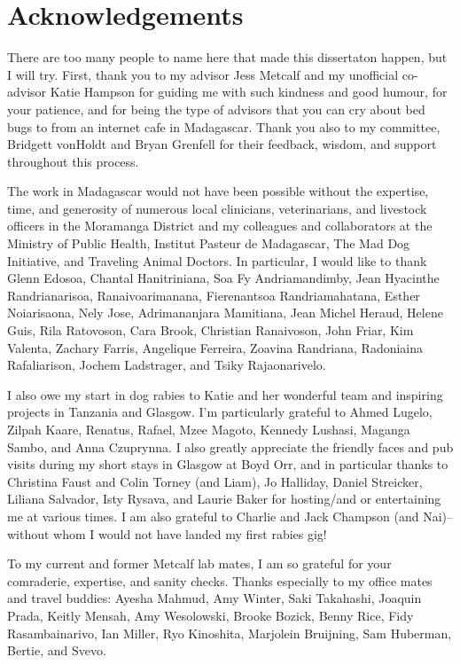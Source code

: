 \newpage

\section*{Acknowledgements}

There are too many people to name here that made this dissertaton happen, but I will try. First, thank you to my advisor Jess Metcalf and my unofficial co-advisor Katie Hampson for guiding me with such kindness and good humour, for your patience, and for being the type of advisors that you can cry about bed bugs to from an internet cafe in Madagascar. Thank you also to my committee, Bridgett vonHoldt and Bryan Grenfell for their feedback, wisdom, and support throughout this process. 

The work in Madagascar would not have been possible without the expertise, time, and generosity of numerous local clinicians, veterinarians, and livestock officers in the Moramanga District and my colleagues and collaborators at the Ministry of Public Health, Institut Pasteur de Madagascar, The Mad Dog Initiative, and Traveling Animal Doctors. In particular, I would like to thank Glenn Edosoa, Chantal Hanitriniana, Soa Fy Andriamandimby, Jean Hyacinthe Randrianarisoa, Ranaivoarimanana, Fierenantsoa Randriamahatana, Esther Noiarisaona, Nely Jose, Adrimananjara Mamitiana, Jean Michel Heraud, Helene Guis, Rila Ratovoson, Cara Brook, Christian Ranaivoson, John Friar, Kim Valenta, Zachary Farris, Angelique Ferreira, Zoavina Randriana, Radoniaina Rafaliarison, Jochem Ladstrager, and Tsiky Rajaonarivelo.

I also owe my start in dog rabies to Katie and her wonderful team and inspiring projects in Tanzania and Glasgow. I'm particularly grateful to Ahmed Lugelo, Zilpah Kaare, Renatus, Rafael, Mzee Magoto, Kennedy Lushasi, Maganga Sambo, and Anna Czuprynna. I also greatly appreciate the friendly faces and pub visits during my short stays in Glasgow at Boyd Orr, and in particular thanks to Christina Faust and Colin Torney (and Liam), Jo Halliday, Daniel Streicker, Liliana Salvador, Isty Rysava, and Laurie Baker for hosting/and or entertaining me at various times. I am also grateful to Charlie and Jack Champson (and Nai)-- without whom I would not have landed my first rabies gig! 

To my current and former Metcalf lab mates, I am so grateful for your comraderie, expertise, and sanity checks. Thanks especially to my office mates and travel buddies: Ayesha Mahmud, Amy Winter, Saki Takahashi, Joaquin Prada, Keitly Mensah, Amy Wesolowski, Brooke Bozick, Benny Rice, Fidy Rasambainarivo, Ian Miller, Ryo Kinoshita, Marjolein Bruijning, Sam Huberman, Bertie, and Svevo. 


